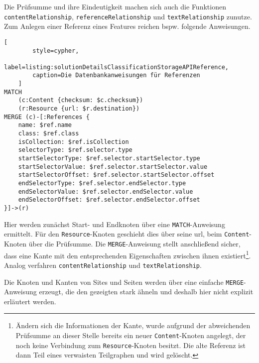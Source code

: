     Die Prüfsumme und ihre Eindeutigkeit machen sich auch die Funktionen
    \texttt{contentRelationship}, \texttt{referenceRelationship} und \texttt{textRelationship} zunutze.
    Zum Anlegen einer Referenz eines Features reichen bspw. folgende Anweisungen.

\begin{lstlisting}[
        style=cypher,
        label=listing:solutionDetailsClassificationStorageAPIReference,
        caption=Die Datenbankanweisungen für Referenzen
    ]
MATCH
    (c:Content {checksum: $c.checksum})
    (r:Resource {url: $r.destination})
MERGE (c)-[:References {
    name: $ref.name
    class: $ref.class
    isCollection: $ref.isCollection
    selectorType: $ref.selector.type
    startSelectorType: $ref.selector.startSelector.type
    startSelectorValue: $ref.selector.startSelector.value
    startSelectorOffset: $ref.selector.startSelector.offset
    endSelectorType: $ref.selector.endSelector.type
    endSelectorValue: $ref.selector.endSelector.value
    endSelectorOffset: $ref.selector.endSelector.offset
}]->(r)
    \end{lstlisting}

    Hier werden zunächst Start- und Endknoten über eine \texttt{MATCH}-Anweisung ermittelt.
    Für den \texttt{Resource}-Knoten geschieht dies über seine \gls{url},
    beim \texttt{Content}-Knoten über die Prüfsumme.
    Die \texttt{MERGE}-Anweisung stellt anschließend sicher,
    dass eine Kante mit den entsprechenden Eigenschaften zwischen ihnen
    existiert\footnote{Ändern sich die Informationen der Kante, wurde aufgrund der abweichenden
    Prüfsumme an dieser Stelle bereits ein neuer \texttt{Content}-Knoten angelegt,
    der noch keine Verbindung zum \texttt{Resource}-Knoten besitzt.
    Die alte Referenz ist dann Teil eines verwaisten Teilgraphen und wird gelöscht.}.
    Analog verfahren \texttt{contentRelationship} und \texttt{textRelationship}.

    Die Knoten und Kanten von Sites und Seiten werden über eine einfache \texttt{MERGE}-Anweisung erzeugt,
    die den gezeigten stark ähneln und deshalb hier nicht explizit erläutert werden.
